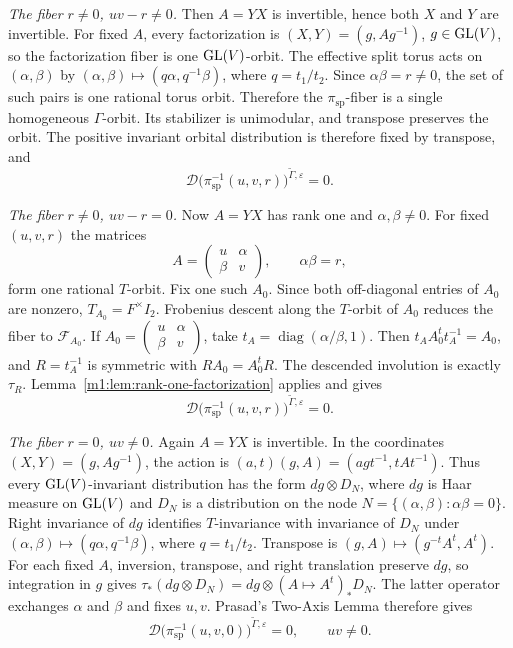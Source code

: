 \emph{The fiber $r\neq0$, $uv-r\neq0$.}
Then $A=YX$ is invertible, hence both $X$ and $Y$ are invertible.  For fixed
$A$, every factorization is \((X,Y)=(g,Ag^{-1})\), \(g\in\operatorname{GL}(V)\), so the factorization
fiber is one $\operatorname{GL}(V)$-orbit.  The effective split torus
acts on $(\alpha,\beta)$ by \((\alpha,\beta)\longmapsto (q\alpha,q^{-1}\beta)\), where
\(q=t_1/t_2\). Since $\alpha\beta=r\neq0$, the set of such pairs is one rational torus
orbit.  Therefore the $\pi_{\mathrm{sp}}$-fiber is a single
homogeneous $\Gamma$-orbit.  Its stabilizer is unimodular, and transpose preserves
the orbit.  The positive invariant orbital distribution is therefore fixed
by transpose, and
\[
    \mathcal D\bigl(\pi_{\mathrm{sp}}^{-1}(u,v,r)\bigr)^{\widetilde \Gamma,\varepsilon}=0.
\]

\emph{The fiber $r\neq0$, $uv-r=0$.}
Now $A=YX$ has rank one and $\alpha,\beta\neq0$.  For fixed $(u,v,r)$ the
matrices
\[
    A=\begin{pmatrix}u&\alpha\\\beta&v\end{pmatrix},
    \qquad \alpha\beta=r,
\]
form one rational $T$-orbit.  Fix one such $A_0$.  Since both off-diagonal
entries of $A_0$ are nonzero, \(T_{A_0}=F^\times I_2\). Frobenius descent along the $T$-orbit of $A_0$
reduces the fiber to
$\mathcal F_{A_0}$. If $A_0=\begin{pmatrix}u&\alpha\\\beta&v\end{pmatrix}$,
take $t_A=\operatorname{diag}(\alpha/\beta,1)$. Then
$t_AA_0^tt_A^{-1}=A_0$, and $R=t_A^{-1}$ is symmetric with
$RA_0=A_0^tR$. The descended involution is exactly $\tau_R$.
Lemma~\ref{m1:lem:rank-one-factorization} applies and gives
\[
    \mathcal D\bigl(\pi_{\mathrm{sp}}^{-1}(u,v,r)\bigr)^{\widetilde \Gamma,\varepsilon}=0.
\]

\emph{The fiber $r=0$, $uv\neq0$.}
Again $A=YX$ is invertible. In the coordinates
$(X,Y)=(g,Ag^{-1})$, the action is
$(a,t)(g,A)=(agt^{-1},tAt^{-1})$. Thus every
$\operatorname{GL}(V)$-invariant distribution has the form $dg\otimes D_N$,
where $dg$ is Haar measure on $\operatorname{GL}(V)$ and $D_N$ is a distribution
on the node $N=\{(\alpha,\beta):\alpha\beta=0\}$.
Right invariance of $dg$ identifies $T$-invariance with invariance
of $D_N$ under $(\alpha,\beta)\mapsto(q\alpha,q^{-1}\beta)$,
where $q=t_1/t_2$.
Transpose is $(g,A)\mapsto(g^{-t}A^t,A^t)$. For each fixed $A$,
inversion, transpose, and right translation preserve $dg$, so
integration in $g$ gives
$\tau_*(dg\otimes D_N)=dg\otimes(A\mapsto A^t)_*D_N$.
The latter operator exchanges $\alpha$ and $\beta$ and fixes $u,v$.
Prasad's Two-Axis Lemma therefore gives
\[
    \mathcal D\bigl(\pi_{\mathrm{sp}}^{-1}(u,v,0)\bigr)^{\widetilde \Gamma,\varepsilon}=0,
    \qquad uv\neq0.
\]


